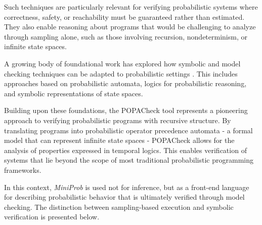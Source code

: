 Such techniques are particularly relevant for verifying probabilistic systems where correctness, safety, or reachability must be guaranteed rather than estimated.
They also enable reasoning about programs that would be challenging to analyze through sampling alone, such as those involving recursion, nondeterminism, or infinite state
spaces.

A growing body of foundational work has explored how symbolic and model checking techniques can be adapted to probabilistic
settings \cite{BaierClarkeHartonasGarmhausenKwiatkowskaRyan1997,EsparzaKuceraMayr2006,EtessamiYannakakis2012}. This includes approaches based on probabilistic automata, logics for probabilistic reasoning, and
symbolic representations of state spaces.

Building upon these foundations, the POPACheck tool \cite{POPACheck} represents a pioneering approach to verifying probabilistic programs with recursive structure.
By translating programs into probabilistic operator precedence automata - a formal model that can represent infinite state spaces - POPACheck allows for the analysis
of properties expressed in temporal logics. This enables verification of systems that lie beyond the scope of most traditional probabilistic programming
frameworks.

In this context, \emph{MiniProb} is used not for inference, but as a front-end language for describing probabilistic behavior that is ultimately verified through
model checking. The distinction between sampling-based execution and symbolic verification is presented below.

